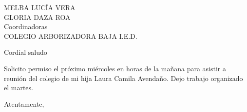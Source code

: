 \documentclass[letterpaper,spanish]{letter}
\date{8 de agosto de 2016}
\begin{document}
\begin{letter}{MELBA LUCÍA VERA\\GLORIA DAZA ROA\\Coordinadoras\\COLEGIO ARBORIZADORA BAJA I.E.D.}
	
\opening{Cordial saludo}
Solicito permiso el próximo miércoles en horas de la mañana para asistir a reunión del colegio de mi hija Laura Camila Avendaño. Dejo trabajo organizado el martes.

\closing{Atentamente,}


\end{letter}
\end{document}
